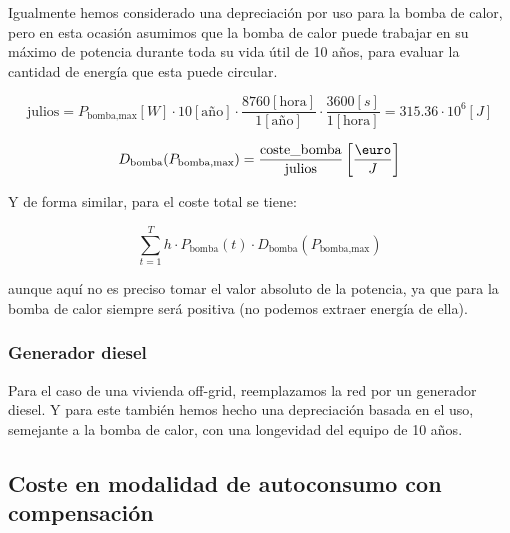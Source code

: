 Igualmente hemos considerado una depreciación por uso para la bomba de calor,
pero en esta ocasión asumimos que la bomba de calor puede trabajar en su máximo
de potencia durante toda su vida útil de 10 años, para evaluar la cantidad de
energía que esta puede circular.

\begin{equation}
	\text{julios} = P_\text{bomba,max}[W] \cdot 10[\text{año}] \cdot \frac{8760[\text{hora}]}{1[\text{año}]} \cdot \frac{3600[s]}{1[\text{hora}]} = 315.36 \cdot 10^6 [J]
\end{equation}

\begin{equation}
	D_\text{bomba}(P_\text{bomba,max}) = \frac{\text{coste\_bomba}}{\text{julios}} \left[\frac{\text{\euro}}{J}\right]
\end{equation}

Y de forma similar, para el coste total se tiene:

\begin{equation}
	\sum_{t=1}^{T} h \cdot P_\text{bomba}(t) \cdot D_\text{bomba}(P_\text{bomba,max})
\end{equation}

aunque aquí no es preciso tomar el valor absoluto de la potencia, ya que para
la bomba de calor siempre será positiva (no podemos extraer energía de ella).


\subsubsection{Generador diesel}

Para el caso de una vivienda off-grid, reemplazamos la red por un generador
diesel. Y para este también hemos hecho una depreciación basada en el uso,
semejante a la bomba de calor, con una longevidad del equipo de 10 años.


\subsection{Coste en modalidad de autoconsumo con compensación}

